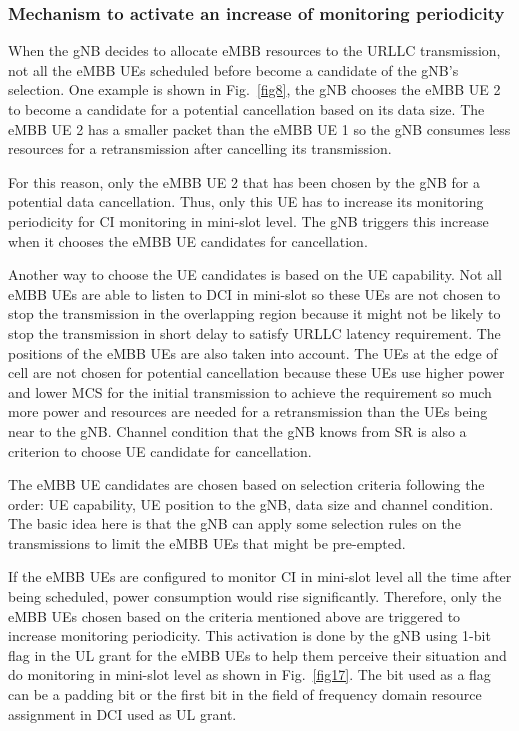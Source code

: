 \documentclass{ieeeaccess}
\begin{document}
\subsubsection{Mechanism to activate an increase of monitoring periodicity}
When the gNB decides to allocate eMBB resources to the URLLC transmission, not all the eMBB UEs scheduled before become a candidate of the gNB's selection. One example is shown in Fig.~\ref{fig8}, the gNB chooses the eMBB UE 2 to become a candidate for a potential cancellation based on its data size. The eMBB UE 2 has a smaller packet than the eMBB UE 1 so the gNB consumes less resources for a retransmission after cancelling its transmission. 

For this reason, only the eMBB UE 2 that has been chosen by the gNB for a potential data cancellation. Thus, only this UE has to increase its monitoring periodicity for CI monitoring in mini-slot level. The gNB triggers this increase when it chooses the eMBB UE candidates for cancellation.

Another way to choose the UE candidates is based on the UE capability. Not all eMBB UEs are able to listen to DCI in mini-slot so these UEs are not chosen to stop the transmission in the overlapping region because it might not be likely to stop the transmission in short delay to satisfy URLLC latency requirement.
The positions of the eMBB UEs are also taken into account. The UEs at the edge of cell are not chosen for potential cancellation because these UEs use higher power and lower MCS for the initial transmission to achieve the requirement so much more power and resources are needed for a retransmission than the UEs being near to the gNB. Channel condition that the gNB knows from SR is also a criterion to choose UE candidate for cancellation.

The eMBB UE candidates are chosen based on selection criteria following the order: UE capability, UE position to the gNB, data size and channel condition. The basic idea here is that the gNB can apply some selection rules on the transmissions to limit the eMBB UEs that might be pre-empted.

If the eMBB UEs are configured to monitor CI in mini-slot level all the time after being scheduled, power consumption would rise significantly. Therefore, only the eMBB UEs chosen based on the criteria mentioned above are triggered to increase monitoring periodicity. This activation is done by the gNB using 1-bit flag in the UL grant for the eMBB UEs to help them perceive their situation and do monitoring in mini-slot level as shown in Fig.~\ref{fig17}. The bit used as a flag can be a padding bit or the first bit in the field of frequency domain resource assignment in DCI used as UL grant.
\end{document}
